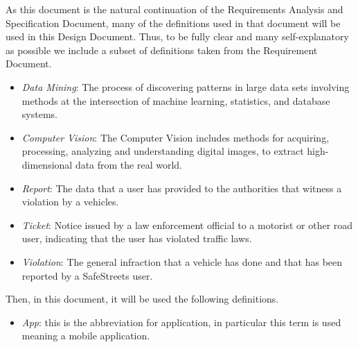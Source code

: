 As this document is the natural continuation of the Requirements Analysis and Specification Document, many of the definitions used in that document will be used in this Design Document.
Thus, to be fully clear and many self-explanatory as possible we include a subset of definitions taken from the Requirement Document.

\begin{itemize}
	\item \textit{Data Mining}: The process of discovering patterns in large data sets involving methods at the intersection of machine learning, statistics, and database systems.
	
	\item \textit{Computer Vision}: The Computer Vision includes methods for acquiring, processing, analyzing and understanding digital images, to extract high-dimensional data from the real world.
	
	
	\item \textit{Report}: The data that a user has provided to the authorities that witness a violation by a vehicles.
	
	\item \textit{Ticket}: Notice issued by a law enforcement official to a motorist or other road user, indicating that the user has violated traffic laws.
	
	\item \textit{Violation}: The general infraction that a vehicle has done and that has been reported by a SafeStreets user.
	
	\begin{comment}
		\item \textit{Guest}: This actor plays the role of a person who is not registered and thus logged in.
	
		\item \textit{User}: This actor refers to the condition of a normal person (not an officer) already signed up.
		
		\item \textit{Officer} or \textit{Authority}: This actor represents a public officer that interacts with SafeStreets in some ways.
		
		\item \textit{Customer}: either a Guest or an Authority
	\end{comment}
\end{itemize}

\flushleft
Then, in this document, it will be used the following definitions.

\begin{itemize}
	\item \textit{App}: this is the abbreviation for application, in particular this term is used meaning a mobile application.
\end{itemize}